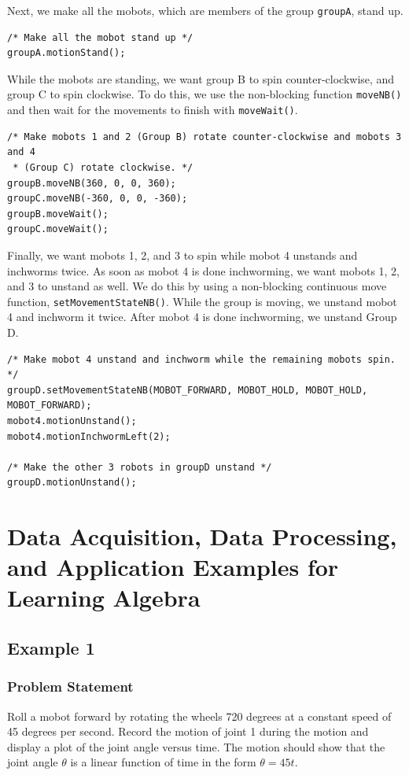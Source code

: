 \documentclass{article}
\begin{document}
Next, we make all the mobots, which are members of the group \texttt{groupA}, 
stand up.
\begin{verbatim}
/* Make all the mobot stand up */
groupA.motionStand();
\end{verbatim}

While the mobots are standing, we want group B to spin counter-clockwise, and group
C to spin clockwise. To do this, we use the non-blocking function \texttt{moveNB()}
and then wait for the movements to finish with \texttt{moveWait()}.
\begin{verbatim}
/* Make mobots 1 and 2 (Group B) rotate counter-clockwise and mobots 3 and 4
 * (Group C) rotate clockwise. */
groupB.moveNB(360, 0, 0, 360);
groupC.moveNB(-360, 0, 0, -360);
groupB.moveWait();
groupC.moveWait();
\end{verbatim}

Finally, we want mobots 1, 2, and 3 to spin while mobot 4 unstands and inchworms twice.
As soon as mobot 4 is done inchworming, we want mobots 1, 2, and 3 to unstand as well.
We do this by using a non-blocking continuous move function, \texttt{setMovementStateNB()}.
While the group is moving, we unstand mobot 4 and inchworm it twice. After mobot 4 is
done inchworming, we unstand Group D.
\begin{verbatim}
/* Make mobot 4 unstand and inchworm while the remaining mobots spin. */
groupD.setMovementStateNB(MOBOT_FORWARD, MOBOT_HOLD, MOBOT_HOLD, MOBOT_FORWARD);
mobot4.motionUnstand();
mobot4.motionInchwormLeft(2);

/* Make the other 3 robots in groupD unstand */
groupD.motionUnstand();
\end{verbatim}

\section{Data Acquisition, Data Processing, and Application Examples for Learning Algebra}
\subsection{Example 1}
\subsubsection{Problem Statement}
Roll a mobot forward by rotating the wheels 720 degrees at a constant speed of 45 degrees per
second. Record the motion of joint 1 during the motion and display a plot
of the joint angle versus time. The motion should show that the joint angle $\theta$
is a linear function of time in the form $\theta = 45t$.
\end{document}
